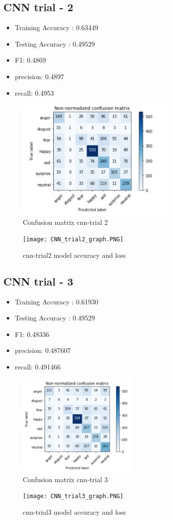 \subsection{CNN trial - 2}
\begin{itemize}
  \item Training Accuracy : 0.63449
  \item Testing Accuracy  : 0.49529
  \item F1:  0.4869
  \item precision: 0.4897
 \item  recall: 0.4953
\end{itemize}
\begin{figure}[h]
\label{ss}
\centering
\includegraphics[width= 8cm]{confmatr_cnn2.PNG}
\caption{Confusion matrix cnn-trial 2}
\end{figure}
\begin{figure}[h]
\label{ss}
\centering
\texttt{[image: CNN\_trial2\_graph.PNG]}
\caption{cnn-trial2 model accuracy and loss}
\end{figure}

\subsection{CNN trial - 3}
\begin{itemize}
  \item Training Accuracy : 0.61930
  \item Testing Accuracy  : 0.49529
  \item F1:  0.48336
  \item precision: 0.487607
  \item recall: 0.491466
\end{itemize}
\begin{figure}[h]
\label{ss}
\centering
\includegraphics[width= 6cm]{confmatr_cnn3.PNG}
\caption{Confusion matrix cnn-trial 3}
\end{figure}
\begin{figure}[h]
\label{ss}
\centering
\texttt{[image: CNN\_trial3\_graph.PNG]}
\caption{cnn-trial3 model accuracy and loss}
\end{figure}


